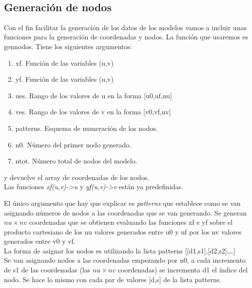 \documentclass[11pt]{article}
\providecommand{\tightlist}{%
      \setlength{\itemsep}{0pt}\setlength{\parskip}{0pt}}
\begin{document}
    \begin{center}
    \end{center}
    { \hspace*{\fill} \\}
    
    \hypertarget{generaciuxf3n-de-nodos}{%
\subsection{Generación de nodos}\label{generaciuxf3n-de-nodos}}

Con el fin facilitar la generación de los datos de los modelos vamos a
incluir unas funciones para la generación de coordenadas y nodos. La
función que usaremos es gennodos. Tiene los siguientes argumentos:

\begin{enumerate}
\def\labelenumi{\arabic{enumi}.}
\tightlist
\item
  xf. Función de las variables (u,v)
\item
  yf. Función de las variables (u,v)
\item
  ues. Rango de los valores de u en la forma {[}u0,uf,nu{]}
\item
  ves. Rango de los valores de v en la forma {[}v0,vf,nv{]}
\item
  patterns. Esquema de numeración de los nodos.
\item
  n0. Número del primer nodo generado.
\item
  ntot. Número total de nodos del modelo.
\end{enumerate}

y devuelve el array de coordenadas de los nodos.\\
Las funciones \emph{xf(u,v)-\textgreater u} y
\emph{yf(u,v)-\textgreater v} están ya predefinidas.

El único argumento que hay que explicar es \emph{patterns} que establece
como se van asignando números de nodos a las coordenadas que se van
generando. Se generan $nu\times{}nv$ coordenadas que se obtienen
evaluando las funciones xf e yf sobre el producto cartesiano de los nu
valores generados entre u0 y uf por los nv valores generados entre v0 y
vf.\\
La forma de asignar los nodos es utilizando la lista patterns
{[}{[}d1,s1{]},{[}d2,s2{]},\ldots{]}\\
Se van asignando nodos a las coordenadas empezando por n0, a cada
incremento de s1 de las coordenadas (las $nu\times{}nv$ coordenadas)
se incrementa d1 el índice del nodo. Se hace lo mismo con cada par de
valores {[}d,s{]} de la lista patterns.
\end{document}

